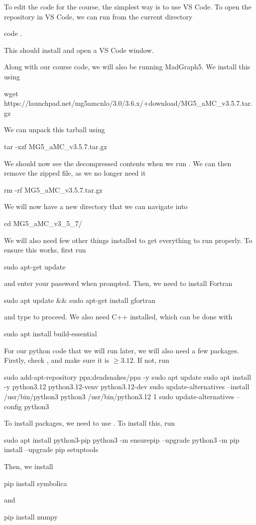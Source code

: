 To edit the code for the course, the simplest way is to use VS Code. To open the repository in VS Code, we can run from the current directory
\begin{codeenv}
    code .
\end{codeenv}
This should install and open a VS Code window.

Along with our course code, we will also be running MadGraph5. We install this using
\begin{codeenv}
     wget https://launchpad.net/mg5amcnlo/3.0/3.6.x/+download/MG5_aMC_v3.5.7.tar.gz
\end{codeenv}
We can unpack this tarball using
\begin{codeenv}
     tar -xzf MG5_aMC_v3.5.7.tar.gz
\end{codeenv}
We should now see the decompressed contents when we run . We can then remove the zipped file, as we no longer need it
\begin{codeenv}
     rm -rf MG5_aMC_v3.5.7.tar.gz
\end{codeenv}
We will now have a new directory that we can navigate into
\begin{codeenv}
     cd MG5_aMC_v3_5_7/
\end{codeenv}

We will also need few other things installed to get everything to run properly. To ensure this works, first run
\begin{codeenv}
   sudo apt-get update
\end{codeenv}
and enter your password when prompted. Then, we need to install Fortran
\begin{codeenv}
     sudo apt update && sudo apt-get install gfortran
\end{codeenv}
and type  to proceed. We also need C++ installed, which can be done with
\begin{codeenv}
     sudo apt install build-essential
\end{codeenv}

For our python code that we will run later, we will also need a few packages. Firstly, check , and make sure it is $\geq 3.12$. If not, run
\begin{codeenv}
   sudo add-apt-repository ppa:deadsnakes/ppa -y 
   sudo apt update 
   sudo apt install -y python3.12 python3.12-venv python3.12-dev 
   sudo update-alternatives --install /usr/bin/python3 python3 /usr/bin/python3.12 1 
   sudo update-alternatives --config python3
\end{codeenv}
To install packages, we need to use . To install this, run
\begin{codeenv}
    sudo apt install python3-pip
    python3 -m ensurepip --upgrade 
    python3 -m pip install --upgrade pip setuptools
\end{codeenv}
Then, we install 
\begin{codeenv}
    pip install symbolica
\end{codeenv}
and 
\begin{codeenv}
    pip install numpy
\end{codeenv}

